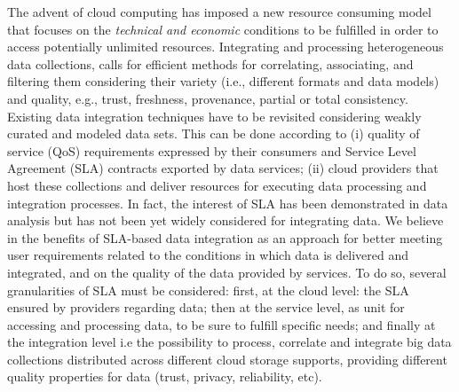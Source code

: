 %


\color{black}
The advent of cloud computing has imposed a new   resource consuming model that focuses on
 the \textit{technical and economic} conditions to be fulfilled in order to access potentially unlimited resources. Integrating and processing heterogeneous data collections, calls for efficient methods for correlating, associating, and filtering them considering their variety (i.e., different formats and data models) and   quality, e.g., trust, freshness, provenance, partial or total consistency. 
Existing data integration techniques have to be revisited considering weakly curated and modeled data sets. This can be done according to (i) quality of service (QoS) requirements expressed by their consumers and Service Level Agreement (SLA) contracts exported by data services; (ii)  cloud providers that host  these collections and deliver resources for executing  data processing and integration processes.
In fact,  the interest of SLA has been demonstrated  in data analysis but has not been yet widely considered for integrating data. 
We believe in the benefits of SLA-based data integration as an approach for better meeting  user  requirements related to the conditions in which data is delivered and integrated, and on the quality of the data provided by services.
To do so, several granularities of SLA must be considered: first, at the cloud level: the SLA ensured by providers regarding data; then at the service level, as unit for accessing and processing data, to be sure to fulfill  specific  needs; and finally at the integration level i.e the possibility to process, correlate and integrate big data collections distributed across different cloud storage supports, providing different quality properties for data (trust, privacy, reliability, etc).

 

